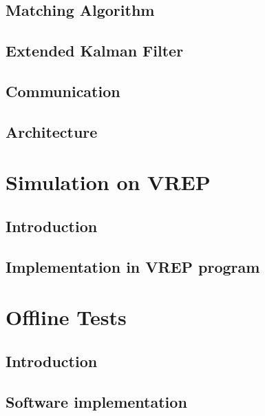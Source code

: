 \documentclass{book} %
\begin{document}
\section{Matching Algorithm}


\section{Extended Kalman Filter}


\section{Communication}


\section{Architecture} \label{sec:SoftArch}



\chapter{Simulation on VREP}
\section{Introduction}


\section{Implementation in VREP program}


\chapter{Offline Tests}
\section{Introduction}


\section{Software implementation}

\end{document}
